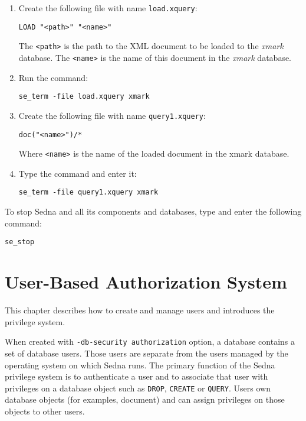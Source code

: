 \documentclass[a4paper,12pt]{article}
\begin{document}
\begin{enumerate}
\item Create the following file with name \verb!load.xquery!:

\begin{verbatim}
LOAD "<path>" "<name>"
\end{verbatim}

The \verb!<path>! is the path to the XML document to be loaded to the
\emph{xmark} database. The \verb!<name>! is the name of this document in the
\emph{xmark} database.

\item Run the command:

\begin{verbatim}
se_term -file load.xquery xmark
\end{verbatim}

\item Create the following file with name \verb!query1.xquery!:

\begin{verbatim}
doc("<name>")/*
\end{verbatim}

Where \verb!<name>! is the name of the loaded document in the xmark database.

\item Type the command and enter it:

\begin{verbatim}
se_term -file query1.xquery xmark
\end{verbatim}
\end{enumerate}

To stop Sedna and all its components and databases, type and enter the following
command:

\begin{verbatim}
se_stop
\end{verbatim}

\section{User-Based Authorization System}

This chapter describes how to create and manage users and introduces the
privilege system.

When created with \verb!-db-security authorization! option, a database contains
a set of database users. Those users are separate from the users managed by the
operating system on which Sedna runs. The primary function of the Sedna
privilege system is to authenticate a user and to associate that user with
privileges on a database object such as \verb!DROP!, \verb!CREATE! or
\verb!QUERY!. Users own database objects (for examples, document) and can
assign privileges on those objects to other users.
\end{document}
